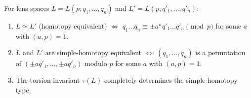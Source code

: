 For lens spaces $L = L(p; q_1, \dots, q_n)$ and $L' = L(p; q'_1, \dots, q'_n)$:
\begin{enumerate}
\item $L \simeq L'$ (homotopy equivalent) $\iff$ $q_1 \dots q_n \equiv \pm a^n q'_1 \dots q'_n \pmod{p}$ for some $a$ with $(a, p) = 1$.
\item $L$ and $L'$ are simple-homotopy equivalent $\iff$ $(q_1, \dots, q_n)$ is a permutation of $(\pm a q'_1, \dots, \pm a q'_n)$ modulo $p$ for some $a$ with $(a, p) = 1$.
\item The torsion invariant $\tau(L)$ completely determines the simple-homotopy type.
\end{enumerate}
